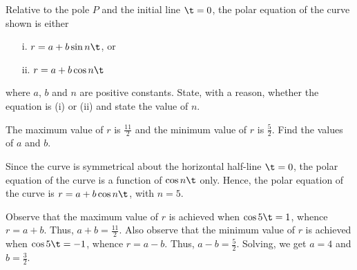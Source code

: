 \begin{problem}
    \begin{center}
    \end{center}
     Relative to the pole $P$ and the initial line $\t = 0$, the polar equation of the curve shown is either
    
    \begin{enumerate}
        \item[i.] $r = a+b\sin n\t$, or
        \item[ii.] $r = a + b\cos n\t$
    \end{enumerate}
     where $a$, $b$ and $n$ are positive constants. State, with a reason, whether the equation is (i) or (ii) and state the value of $n$.

    The maximum value of $r$ is $\frac{11}2$ and the minimum value of $r$ is $\frac52$. Find the values of $a$ and $b$.
\end{problem}
\begin{solution}
    Since the curve is symmetrical about the horizontal half-line $\t = 0$, the polar equation of the curve is a function of $\cos n\t$ only. Hence, the polar equation of the curve is $r = a+b\cos n\t$, with $n = 5$.

    Observe that the maximum value of $r$ is achieved when $\cos 5\t = 1$, whence $r = a + b$. Thus, $a + b = \frac{11}2$. Also observe that the minimum value of $r$ is achieved when $\cos 5\t = -1$, whence $r = a-b$. Thus, $a - b = \frac52$. Solving, we get $a = 4$ and $b = \frac32$.
\end{solution}

